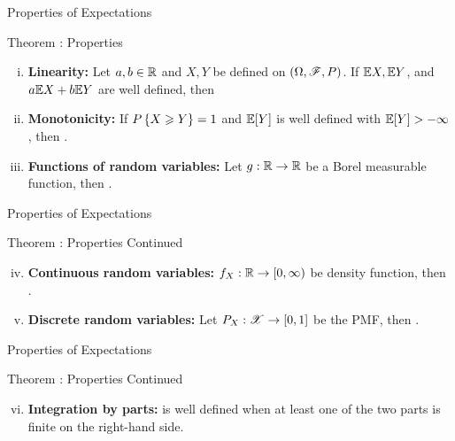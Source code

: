 \documentclass[12pt,aspectratio=169]{beamer}
\begin{document}
\begin{frame}{Properties of Expectations}
\begin{block}{Theorem : Properties}
\begin{enumerate}[(i)]
\item <1-> \textbf{Linearity:}
Let $a, b \in \mathbb{R}$ and $X, Y$ be defined on $(\Omega, \mathscr{F}, P)$. 
If $\mathbb{E} X, \mathbb{E} Y$, and $a\mathbb{E} X + b\mathbb{E} Y$ are well defined, then %
\item <2-> \textbf{Monotonicity:}
If $P\left\{X \geqslant Y\right\} = 1$ and $\mathbb{E}[Y]$ is well defined
with $\mathbb{E}[Y] > -\infty$, then 
\EQ{\E[X] \ge \E[Y]}.
\item <3-> \textbf{Functions of random variables:}
Let $g: \mathbb{R} \to \mathbb{R}$ be a Borel measurable function, then 
. 
\end{enumerate}
\end{block}
\end{frame}

\begin{frame}{Properties of Expectations}
\begin{block}{Theorem : Properties Continued}
\begin{enumerate}[(i)]
\setcounter{enumi}{3}
\item <1-> \textbf{Continuous random variables:} $f_X: \mathbb{R} \to [0, \infty)$ be density function, 
then . 
\item <2-> \textbf{Discrete random variables:} Let $P_X: \mathscr{X} \to [0,1]$ be the PMF, 
then . 
\end{enumerate}
\end{block}
\end{frame}

\begin{frame}{Properties of Expectations}
\begin{block}{Theorem : Properties Continued}
\begin{enumerate}[(i)]
\setcounter{enumi}{5}
\item <1-> \textbf{Integration by parts:}  is well defined when at least one of the two parts is finite on the right-hand side. 
\end{enumerate}
\end{block}
\end{frame}
\end{document}
